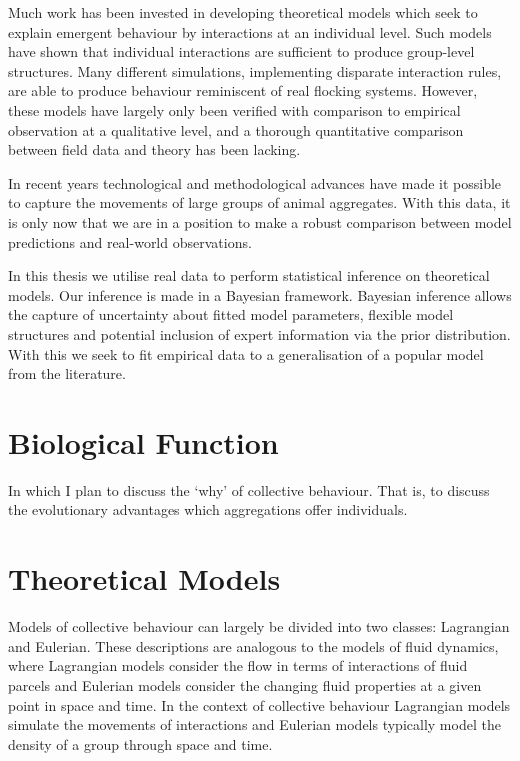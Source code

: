 Much work has been invested in developing theoretical models which seek to explain emergent behaviour by interactions at an individual level. Such models have shown that individual interactions are sufficient to produce group-level structures. Many different simulations, implementing disparate interaction rules, are able to produce behaviour reminiscent of real flocking systems. However, these models have largely only been verified with comparison to empirical observation at a qualitative level, and a thorough quantitative comparison between field data and theory has been lacking.

In recent years technological and methodological advances have made it possible to capture the movements of large groups of animal aggregates. With this data, it is only now that we are in a position to make a robust comparison between model predictions and real-world observations.

In this thesis we utilise real data to perform statistical inference on theoretical models. Our inference is made in a Bayesian framework. Bayesian inference allows the capture of uncertainty about fitted model parameters, flexible model structures and potential inclusion of expert information via the prior distribution. With this we seek to fit empirical data to a generalisation of a popular model from the literature.

\section{Biological Function}
\label{sec:biological_function}

\color{red} In which I plan to discuss the `why' of collective behaviour. That is, to discuss the evolutionary advantages which aggregations offer individuals. \color{black}

\section{Theoretical Models}
\label{sec:models}

Models of collective behaviour can largely be divided into two classes: Lagrangian and Eulerian. These descriptions are analogous to the models of fluid dynamics, where Lagrangian models consider the flow in terms of interactions of fluid parcels and Eulerian models consider the changing fluid properties at a given point in space and time. In the context of collective behaviour Lagrangian models simulate the movements of interactions and Eulerian models typically model the density of a group through space and time.

